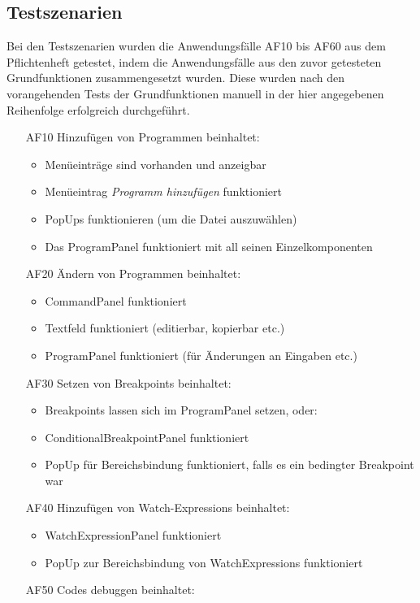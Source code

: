 \documentclass[parskip=full]{scrartcl}
\begin{document}
\label{testszenarien}
\subsection{Testszenarien}
Bei den Testszenarien wurden die Anwendungsfälle AF10 bis AF60 aus dem Pflichtenheft getestet, indem die Anwendungsfälle aus den zuvor getesteten Grundfunktionen zusammengesetzt wurden. Diese wurden nach den vorangehenden Tests der Grundfunktionen manuell in der hier angegebenen Reihenfolge erfolgreich durchgeführt.
\begin{itemize} 
	\item[AF10] Hinzufügen von Programmen beinhaltet: 
	\begin{itemize}
		\item Menüeinträge sind vorhanden und anzeigbar
		\item Menüeintrag \textit{Programm hinzufügen} funktioniert
		\item PopUps funktionieren (um die Datei auszuwählen)
		\item Das ProgramPanel funktioniert mit all seinen Einzelkomponenten
	\end{itemize}
	\item[AF20] Ändern von Programmen beinhaltet:
	\begin{itemize}
		\item CommandPanel funktioniert
		\item Textfeld funktioniert (editierbar, kopierbar etc.)
		\item ProgramPanel funktioniert (für Änderungen an Eingaben etc.)
	\end{itemize}
	\item[AF30] Setzen von Breakpoints beinhaltet:
	\begin{itemize}
		\item Breakpoints lassen sich im ProgramPanel setzen, oder:
		\item ConditionalBreakpointPanel funktioniert
		\item PopUp für Bereichsbindung funktioniert, falls es ein bedingter Breakpoint war
	\end{itemize}
	\item[AF40] Hinzufügen von Watch-Expressions beinhaltet:
	\begin{itemize}
		\item WatchExpressionPanel funktioniert
		\item PopUp zur Bereichsbindung von WatchExpressions funktioniert
	\end{itemize}
	\item[AF50] Codes debuggen beinhaltet:

\end{itemize}
\end{document}
